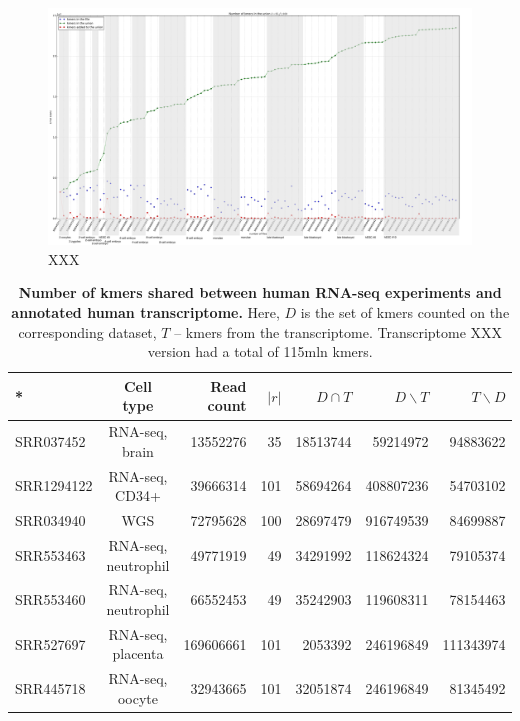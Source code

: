 \documentclass[12pt]{cmuthesis}
\begin{document}
    \begin{figure}
      \includegraphics[width=\linewidth]{figures/huffmer-rnaseq-experiment-cells}
      \caption{XXX}
      \label{fig:denovo:rnaseq}
    \end{figure}


    \begin{table}
      \centering
      \begin{tabular}{l c r r r r r}
          \toprule
          *  & Cell type & Read count & $|r|$ & $D \cap T$ & $D \backslash T$ & $T \backslash D$ \\
          \midrule
          SRR037452 & RNA-seq, brain & 13552276 & 35 & 18513744 & 59214972 & 94883622 \\
          SRR1294122  & RNA-seq, CD34+ & 39666314 & 101 & 58694264 & 408807236 & 54703102 \\
          SRR034940 & WGS & 72795628 & 100 & 28697479 & 916749539 & 84699887 \\
          SRR553463  & RNA-seq, neutrophil & 49771919 & 49 & 34291992 & 118624324 & 79105374 \\
          SRR553460 & RNA-seq, neutrophil & 66552453 & 49 & 35242903 & 119608311 & 78154463 \\
          SRR527697 & RNA-seq, placenta & 169606661 & 101 & 2053392 & 246196849 & 111343974 \\
          SRR445718 & RNA-seq, oocyte & 32943665& 101 & 32051874 & 246196849 & 81345492 \\
          \bottomrule
      \end{tabular}
      \caption{\textbf{Number of kmers shared between human RNA-seq experiments and annotated human transcriptome.} Here, $D$ is the set of kmers counted on the corresponding dataset, $T$ -- kmers from the transcriptome. Transcriptome XXX version had a total of 115mln kmers.}
      \label{tab:denovo:transciptome_overlap}
    \end{table}
\end{document}
